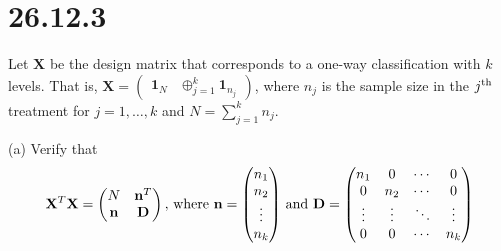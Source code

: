 \section*{26.12.3}
Let $\mathbf X$ be the design matrix that corresponds to a
one-way classification with $k$ levels.
That is, $\mathbf X=\begin{pmatrix}\mathbf 1_N
&\oplus_{j=1}^k\mathbf 1_{n_j}\end{pmatrix}$, where $n_j$ is the sample size
in the $j^{\rm th}$ treatment for $j=1,\ldots,k$
and $N=\sum_{j=1}^kn_j$.

\bigskip
\noindent
(a) Verify that
$$\mathbf X^T\mathbf X=
\begin{pmatrix}
N & \mathbf n^T\cr
\mathbf n & \mathbf D
\end{pmatrix},\,
\hbox{where
$\mathbf n=\begin{pmatrix}
n_1\cr
n_2\cr
\vdots\cr
n_k
\end{pmatrix}
$ and
$\mathbf D=\begin{pmatrix}
n_1 & 0 & \cdots & 0\cr
0 & n_2 & \cdots & 0\cr
\vdots & \vdots & \ddots & \vdots\cr
0 & 0 & \cdots & n_k
\end{pmatrix}
$}
$$

